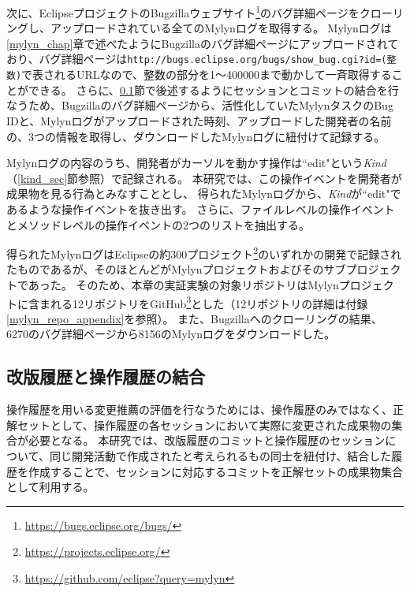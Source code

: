 \documentclass[a4paper]{jsbook}
\begin{document}
次に、EclipseプロジェクトのBugzillaウェブサイト\footnote{\url{https://bugs.eclipse.org/bugs/}}のバグ詳細ページをクローリングし、アップロードされている全てのMylynログを取得する。
Mylynログは\ref{mylyn_chap}章で述べたようにBugzillaのバグ詳細ページにアップロードされており、バグ詳細ページは\texttt{http://bugs.eclipse.org/bugs/show\_bug.cgi?id=(整数)}で表されるURLなので、整数の部分を1〜400000まで動かして一斉取得することができる。
さらに、\ref{joining_sec}節で後述するようにセッションとコミットの結合を行なうため、Bugzillaのバグ詳細ページから、活性化していたMylynタスクのBug IDと、Mylynログがアップロードされた時刻、アップロードした開発者の名前の、3つの情報を取得し、ダウンロードしたMylynログに紐付けて記録する。

Mylynログの内容のうち、開発者がカーソルを動かす操作は``edit"という{\it Kind}（\ref{kind_sec}節参照）で記録される。
本研究では、この操作イベントを開発者が成果物を見る行為とみなすこととし、
得られたMylynログから、{\it Kind}が``edit"であるような操作イベントを抜き出す。
さらに、ファイルレベルの操作イベントとメソッドレベルの操作イベントの2つのリストを抽出する。

得られたMylynログはEclipseの約300プロジェクト\footnote{\url{https://projects.eclipse.org/}}のいずれかの開発で記録されたものであるが、そのほとんどがMylynプロジェクトおよびそのサブプロジェクトであった。
そのため、本章の実証実験の対象リポジトリはMylynプロジェクトに含まれる12リポジトリをGitHub\footnote{\url{https://github.com/eclipse?query=mylyn}}とした（12リポジトリの詳細は付録\ref{mylyn_repo_appendix}を参照）。
また、Bugzillaへのクローリングの結果、6270のバグ詳細ページから8156のMylynログをダウンロードした。

\subsection{改版履歴と操作履歴の結合}\label{joining_sec}
操作履歴を用いる変更推薦の評価を行なうためには、操作履歴のみではなく、正解セットとして、操作履歴の各セッションにおいて実際に変更された成果物の集合が必要となる。
本研究では、改版履歴のコミットと操作履歴のセッションについて、同じ開発活動で作成されたと考えられるもの同士を紐付け、結合した履歴を作成することで、セッションに対応するコミットを正解セットの成果物集合として利用する。
\end{document}
